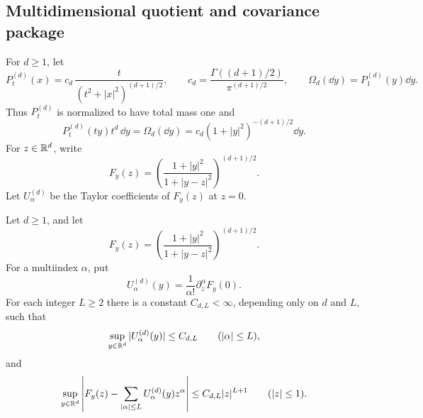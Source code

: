 \subsection{Multidimensional quotient and covariance package}

For \(d\ge1\), let
\[
P_t^{(d)}(x)=c_d\,\frac{t}{(t^2+|x|^2)^{(d+1)/2}},
\qquad
c_d=\frac{\Gamma((d+1)/2)}{\pi^{(d+1)/2}},
\qquad
\Omega_d(\dd y)=P_1^{(d)}(y)\dd y.
\]
Thus \(P_t^{(d)}\) is normalized to have total mass one and
\[
P_t^{(d)}(ty)t^d\,\dd y=\Omega_d(\dd y)
=c_d(1+|y|^2)^{-(d+1)/2}\dd y .
\]
For \(z\in\mathbb{R}^d\), write
\[
F_y(z)=\left(\frac{1+|y|^2}{1+|y-z|^2}\right)^{(d+1)/2}.
\]
Let \(U_\alpha^{(d)}\) be the Taylor coefficients of \(F_y(z)\) at \(z=0\).

\begin{lemma}%
\label{lem:local-multidim-quotient-taylor-remainder-core}
Let \(d\ge1\), and let
\[
F_y(z)=\left(\frac{1+|y|^2}{1+|y-z|^2}\right)^{(d+1)/2}.
\]
For a multiindex \(\alpha\), put
\[
U_\alpha^{(d)}(y)=\frac1{\alpha!}\partial_z^\alpha F_y(0).
\]
For each integer \(L\ge2\) there is a constant \(C_{d,L}<\infty\),
depending only on \(d\) and \(L\), such that
\begin{equation}\label{eq:local-multidim-coefficient-bound}
\sup_{y\in\mathbb{R}^d}|U_\alpha^{(d)}(y)|\le C_{d,L}
\qquad (|\alpha|\le L),
\end{equation}
and
\begin{equation}\label{eq:local-multidim-taylor-remainder}
\sup_{y\in\mathbb{R}^d}\left|
F_y(z)-\sum_{|\alpha|\le L}U_\alpha^{(d)}(y)z^\alpha
\right|
\le C_{d,L}|z|^{L+1}
\qquad (|z|\le1).
\end{equation}
\end{lemma}

